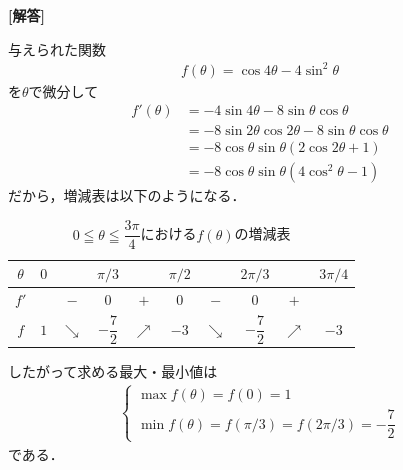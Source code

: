 \documentclass[../../main.tex]{subfiles}
\begin{document}
\begin{oframed}
  
\end{oframed}

{\bf [解答]}

与えられた関数
\begin{align}
  f(\theta) = \cos 4\theta - 4\sin^2\theta
\end{align}
を$\theta$で微分して
\begin{align}
  f'(\theta)
  &=-4\sin4\theta-8\sin\theta\cos\theta \\
  &=-8\sin2\theta\cos2\theta-8\sin\theta\cos\theta\\
  &=-8\cos\theta\sin\theta(2\cos2\theta+1)\\
  &=-8\cos\theta\sin\theta(4\cos^2\theta-1)
\end{align}
だから，増減表は以下のようになる．

\begin{table}[htb]
  \centering
  \caption{$0\leqq\theta\leqq \dfrac{3\pi}{4}$における$f(\theta)$の増減表}
  \begin{tabular}{c|ccccccccc}
    $\theta$ & $0$ & & $\pi/3$ & & $\pi/2$ & & $2\pi/3$ & & $3\pi/4$ \\
    \hline
    $f'$ & & $-$ & $0$ & $+$ & $0$ & $-$ & $0$ & $+$ & \\
    \hline
    $f$ & $1$ & $\searrow$ & $-\dfrac{7}{2}$ & $\nearrow$ & $-3$ & $\searrow$ & $-\dfrac{7}{2}$ & $\nearrow$ & $-3$ \\
  \end{tabular}
\end{table}

したがって求める最大・最小値は
\begin{align}
  \begin{cases}
    \max f(\theta) = f(0) = 1 \\
    \min f(\theta) = f(\pi/3) = f(2\pi/3) = -\dfrac{7}{2}
  \end{cases}
\end{align}
である．

\newpage
\end{document}

